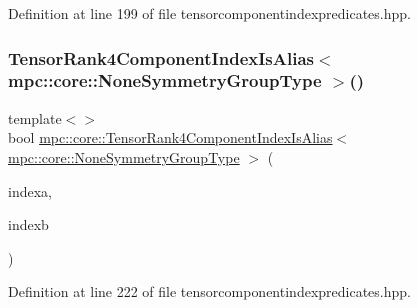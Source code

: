 Definition at line 199 of file tensorcomponentindexpredicates.\+hpp.

\mbox{\label{namespacempc_1_1core_a14e25a11fab9f7ae7575404bbbbf822f}} 
\subsubsection{\texorpdfstring{Tensor\+Rank4\+Component\+Index\+Is\+Alias$<$ mpc\+::core\+::\+None\+Symmetry\+Group\+Type $>$()}{TensorRank4ComponentIndexIsAlias< mpc::core::NoneSymmetryGroupType >()}}
{\footnotesize\ttfamily template$<$$>$ \\
bool \mbox{\hyperlink{namespacempc_1_1core_a6a2bb811eb9c52ad922c8e96c8f0386b}{mpc\+::core\+::\+Tensor\+Rank4\+Component\+Index\+Is\+Alias}}$<$ \mbox{\hyperlink{structmpc_1_1core_1_1_none_symmetry_group_type}{mpc\+::core\+::\+None\+Symmetry\+Group\+Type}} $>$ (\begin{DoxyParamCaption}\item[{const \mbox{\hyperlink{namespacempc_1_1core_a54c081f41b2475abd10182bf023805d2}{mpc\+::core\+::\+Tensor\+Rank4\+Component\+Index}} \&}]{indexa,  }\item[{const \mbox{\hyperlink{namespacempc_1_1core_a54c081f41b2475abd10182bf023805d2}{mpc\+::core\+::\+Tensor\+Rank4\+Component\+Index}} \&}]{indexb }\end{DoxyParamCaption})\hspace{0.3cm}{\ttfamily [inline]}}



Definition at line 222 of file tensorcomponentindexpredicates.\+hpp.

\mbox{\label{namespacempc_1_1core_a40d1fb8009b3f7c34a6ea01a4b46027f}} 
